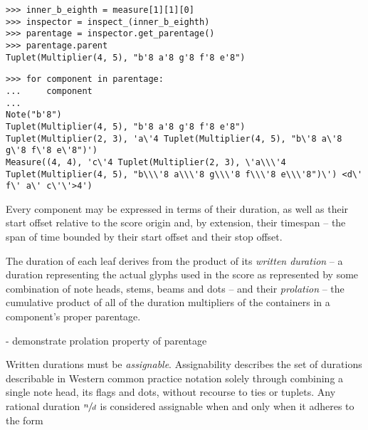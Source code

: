 \begin{comment}
<abjad>
inner_b_eighth = measure[1][1][0]
inspector = inspect_(inner_b_eighth)
parentage = inspector.get_parentage()
parentage.parent
for component in parentage:
    component

</abjad>
\end{comment}

\begin{abjadbookoutput}
\begin{singlespacing}
\vspace{-0.5\baselineskip}
\begin{lstlisting}
>>> inner_b_eighth = measure[1][1][0]
>>> inspector = inspect_(inner_b_eighth)
>>> parentage = inspector.get_parentage()
>>> parentage.parent
Tuplet(Multiplier(4, 5), "b'8 a'8 g'8 f'8 e'8")
\end{lstlisting}
\begin{lstlisting}
>>> for component in parentage:
...     component
...
Note("b'8")
Tuplet(Multiplier(4, 5), "b'8 a'8 g'8 f'8 e'8")
Tuplet(Multiplier(2, 3), 'a\'4 Tuplet(Multiplier(4, 5), "b\'8 a\'8 g\'8 f\'8 e\'8")')
Measure((4, 4), 'c\'4 Tuplet(Multiplier(2, 3), \'a\\\'4 Tuplet(Multiplier(4, 5), "b\\\'8 a\\\'8 g\\\'8 f\\\'8 e\\\'8")\') <d\' f\' a\' c\'\'>4')
\end{lstlisting}
\end{singlespacing}
\end{abjadbookoutput}

Every component may be expressed in terms of their duration, as well as their
start offset relative to the score origin and, by extension, their timespan --
the span of time bounded by their start offset and their stop offset.

The duration of each leaf derives from the product of its \emph{written
duration} -- a duration representing the actual glyphs used in the score as
represented by some combination of note heads, stems, beams and dots -- and
their \emph{prolation} -- the cumulative product of all of the duration
multipliers of the containers in a component's proper parentage.

-   demonstrate prolation property of parentage

Written durations must be \emph{assignable}. Assignability describes the set of
durations describable in Western common practice notation solely through
combining a single note head, its flags and dots, without recourse to ties or
tuplets. Any rational duration $\sfrac{n}{d}$ is considered assignable when and
only when it adheres to the form

